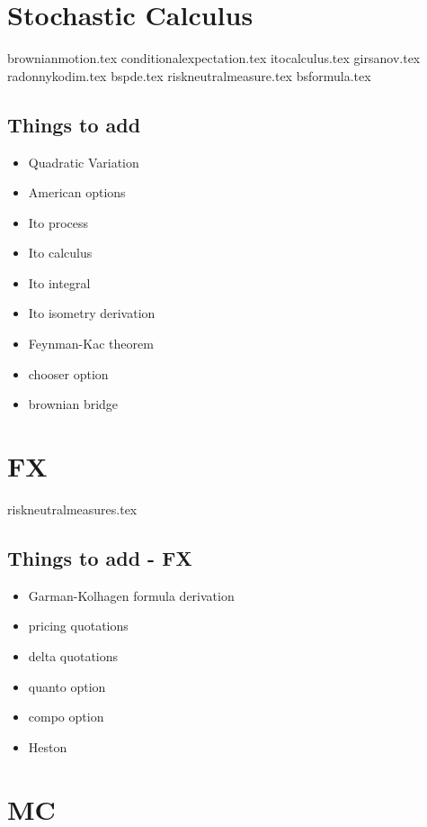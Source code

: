 \documentclass{report}
\begin{document}
\tableofcontents
	
\part{Stochastic Calculus}

{brownianmotion.tex}
{conditionalexpectation.tex}
{itocalculus.tex}
{girsanov.tex}
{radonnykodim.tex}
{bspde.tex}
{riskneutralmeasure.tex}
{bsformula.tex}


\chapter{Things to add}
\begin{itemize}
	\item Quadratic Variation
	\item American options
	\item Ito process
	\item Ito calculus
	\item Ito integral
	\item Ito isometry derivation
	\item Feynman-Kac theorem
	\item chooser option
	\item brownian bridge
\end{itemize}


\part{FX}

{riskneutralmeasures.tex}

\chapter{Things to add - FX}
\begin{itemize}
	\item Garman-Kolhagen formula derivation
	\item pricing quotations
	\item delta quotations
	\item quanto option
	\item compo option
	\item Heston
\end{itemize}


\part{MC}
\end{document}
